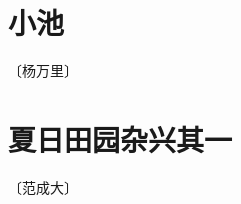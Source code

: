 \documentclass[12pt,UTF-8,openany]{ctexbook}
\begin{document}
\vspace{8pt}


\section{小池}

\begin{center}
    \vspace{10pt}
    
    \begin{normalsize}
        
        〔杨万里〕
        
    \end{normalsize}
    
    \vspace{8pt}
    
    \begin{large}
        
        
        
    \end{large}
    
\end{center}

\vspace{8pt}


\section{夏日田园杂兴其一}

\begin{center}
    \vspace{10pt}
    
    \begin{normalsize}
        
        〔范成大〕
        
    \end{normalsize}
    
    \vspace{8pt}
    
    \begin{large}
        
        
        
    \end{large}
    
\end{center}
\end{document}
